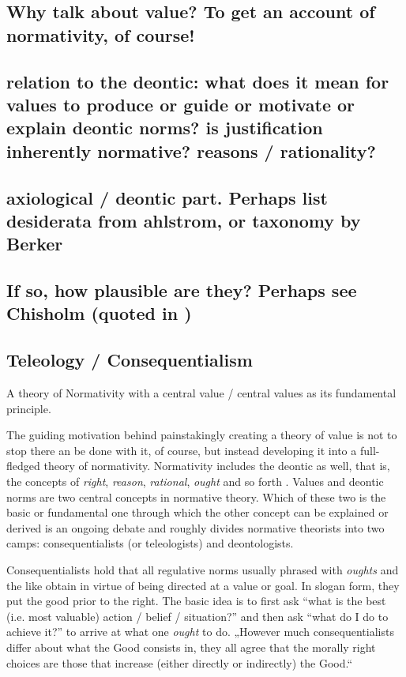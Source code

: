 \documentclass[12pt,numbers=noenddot]{scrartcl}
\begin{document}
\subsection{ Why talk about value? To get an account of normativity, of course! }
\subsection{ relation to the deontic: what does it mean for values to produce or guide or motivate or explain deontic norms? is justification inherently normative? reasons / rationality? }
\subsection{ axiological / deontic part. Perhaps list desiderata from ahlstrom, or taxonomy by Berker}

\subsection{ If so, how plausible are they? Perhaps see Chisholm (quoted in \textcite{Goldman2002-GOLTUO-2})}

\subsection{ Teleology / Consequentialism} \label{subsec: teleology}
A theory of Normativity with a central value / central values as its fundamental principle.

The guiding motivation behind painstakingly creating a theory of value is not to stop there an be done with it, of course, but instead developing it into a 
full-fledged theory of normativity. Normativity includes the deontic as well, that is, the concepts of \emph{right}, \emph{reason}, \emph{rational}, \emph{ought} and so forth \autocite[21]{sep-value-theory}. Values and deontic norms are two central concepts in normative theory. Which of these two is the basic or fundamental one through which the other concept can be explained or derived is an ongoing debate and roughly divides normative theorists into two camps: consequentialists (or teleologists) and deontologists. 

Consequentialists hold that all regulative norms usually phrased with \emph{oughts} and the like obtain in virtue of being directed at a value or goal. In slogan form, they put the good prior to the right. The basic idea is to first ask “what is the best (i.e. most valuable) action / belief / situation?” and then ask “what do I do to achieve it?” to arrive at what one \emph{ought} to do. „However much consequentialists differ about what the Good consists in, they all agree that the morally right choices are those that increase (either directly or indirectly) the Good.“ \autocite{sep-ethics-deontological}
\end{document}
